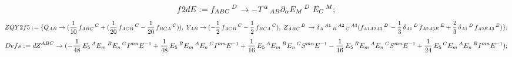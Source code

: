 \documentclass[11pt]{article}
\def\specialcolon{\mathrel{\mathop{:}}\hspace{-.5em}}
\begin{document}
\begin{dmath*}[compact, spread=2pt]
f2dE\specialcolon{}= {f}_{A B C}\,^{D\, } \rightarrow -{T}^{\alpha}\,_{A B} {\partial}_{\alpha}{{E}_{M}\,^{D\, }}\,  {E}_{C}\,^{M};
\end{dmath*}
\begin{dmath*}[compact, spread=2pt]
ZQY2f5\specialcolon{}= \{{Q}_{A B} \rightarrow (\frac{1}{10}\, {f}_{A B C}\,^{C} + (\frac{1}{20}\, {f}_{A C B}\,^{C} - \frac{1}{20}\, {f}_{B C A}\,^{C})),\; {Y}_{A B} \rightarrow ( - \frac{1}{2}\, {f}_{A C B}\,^{C} - \frac{1}{2}\, {f}_{B C A}\,^{C}),\; {Z}_{A B C}\,^{D\, } \rightarrow {\delta}_{A}\,^{A1}\,_{B}\,^{A2}\,_{C}\,^{A3} ({f}_{A1 A2 A3}\,^{D\, } - \frac{1}{3}\, {\delta}_{A1}\,^{D\, } {f}_{A2 A3 E}\,^{E} + \frac{2}{3}\, {\delta}_{A1}\,^{D\, } {f}_{A2 E A3}\,^{E})\};
\end{dmath*}
\begin{dmath*}[compact, spread=2pt]
Defs\specialcolon{}= {dZ}^{A B C} \rightarrow ( - \frac{1}{48}\, {E}_{5}\,^{A} {E}_{m}\,^{B} {E}_{n}\,^{C} {I}^{m n} E{}^{-1} + \frac{1}{48}\, {E}_{5}\,^{B} {E}_{m}\,^{A} {E}_{n}\,^{C} {I}^{m n} E{}^{-1} + \frac{1}{16}\, {E}_{5}\,^{A} {E}_{m}\,^{B} {E}_{n}\,^{C} {S}^{m n} E{}^{-1} - \frac{1}{16}\, {E}_{5}\,^{B} {E}_{m}\,^{A} {E}_{n}\,^{C} {S}^{m n} E{}^{-1} + \frac{1}{24}\, {E}_{5}\,^{C} {E}_{m}\,^{A} {E}_{n}\,^{B} {I}^{m n} E{}^{-1});
\end{dmath*}
\end{document}
